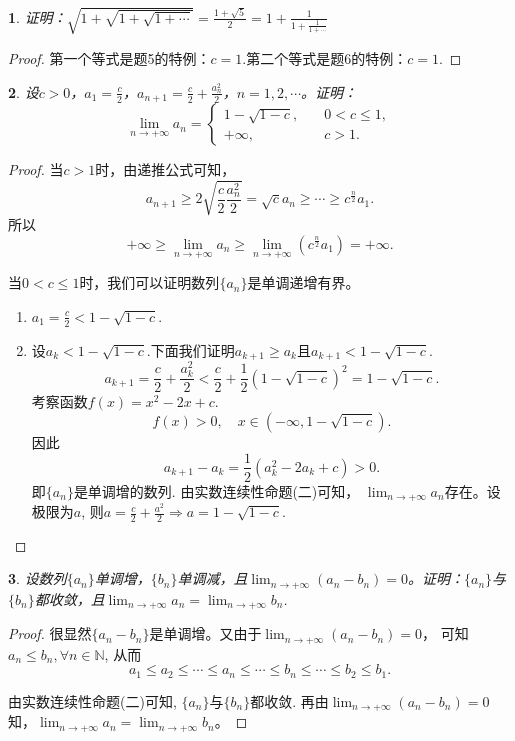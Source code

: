 \documentclass[utf8]{book}
\newtheorem{example}{}[section]             %
\begin{document}
\begin{example}
证明：$\displaystyle \sqrt{1+\sqrt{1+\sqrt{1+\cdots}}}=\frac{1+\sqrt{5}}{2} =  1 + \displaystyle \frac{1}{1+\displaystyle \frac{1}{1+\cdots}}$
\end{example}
\begin{proof}
第一个等式是题5的特例：$c=1$.第二个等式是题6的特例：$c=1$.
\end{proof}
\begin{example}
设$c>0$，$a_1=\frac{c}{2}$，$a_{n+1}=\frac{c}{2}+\frac{a_n^2}{2}$，$n=1,2,\cdots$。证明：
\begin{equation*}
\displaystyle \lim_{n\to +\infty}a_n=
\begin{cases}
1-\sqrt{1-c},\quad&0<c\leq 1,\\
+\infty, \quad&c > 1.
\end{cases}
\end{equation*}
\end{example}
\begin{proof}
当$c>1$时，由递推公式可知，$$a_{n+1}\geq 2\displaystyle\sqrt{\frac{c}{2}{\frac{a_n^2}{2}}}=\sqrt{c}a_n\geq \cdots\geq c^{\frac{n}{2}}a_1.$$
所以$$+\infty \geq \displaystyle \lim_{n\to +\infty}a_n \geq \displaystyle \lim_{n\to +\infty}(c^{\frac{n}{2}}a_1) = +\infty.$$

当$0<c\leq 1$时，我们可以证明数列$\{a_n\}$是单调递增有界。
\renewcommand\labelenumi{\normalfont(\theenumi)}
\begin{enumerate}
\item $a_1 = \frac{c}{2} < 1-\sqrt{1-c}$.
\item 设$a_k < 1-\sqrt{1-c}$.下面我们证明$a_{k+1} \geq a_{k}$且$a_{k+1} < 1-\sqrt{1-c}$.
$$a_{k+1} = \frac{c}{2} + \frac{a_{k}^2}{2} <\frac{c}{2} + \frac{1}{2}\left(1-\sqrt{1-c}\right)^2 = 1-\sqrt{1-c}.$$
考察函数$f(x) = x^2-2x+c$. $$f(x) > 0, \quad x\in(-\infty, 1-\sqrt{1-c}).$$
因此 $$a_{k+1} - a_{k} = \frac{1}{2}(a_k^2-2a_k+c) > 0.$$
即$\{a_n\}$是单调增的数列. 由实数连续性命题(二)可知， $\displaystyle \lim_{n\to +\infty}a_n$存在。设极限为$a$, 则$a=\frac{c}{2}+\frac{a^2}{2}\Rightarrow a = 1-\sqrt{1-c}$.
\end{enumerate}
\end{proof}
\begin{example}
设数列$\{a_n\}$单调增，$\{b_n\}$单调减，且$\displaystyle \lim_{n\to +\infty}(a_n-b_n)=0$。证明：$\{a_n\}$与$\{b_n\}$都收敛，且$\displaystyle \lim_{n\to +\infty}a_n=\displaystyle \lim_{n\to +\infty}b_n$.
\end{example}
\begin{proof}
很显然$\{a_n-b_n\}$是单调增。又由于$\displaystyle \lim_{n\to +\infty}(a_n-b_n)=0$， 可知 $a_n \leq b_n,\forall n\in\mathbb{N}$, 从而
$$a_1 \leq a_2 \leq\cdots\leq a_n \leq \cdots \leq b_n \leq \cdots \leq b_2\leq b_1.$$

由实数连续性命题(二)可知, $\{a_n\}$与$\{b_n\}$都收敛. 再由$\displaystyle \lim_{n\to +\infty}(a_n-b_n)=0$知，$\displaystyle \lim_{n\to +\infty}a_n=\displaystyle \lim_{n\to +\infty}b_n$。
\end{proof}
\end{document}
